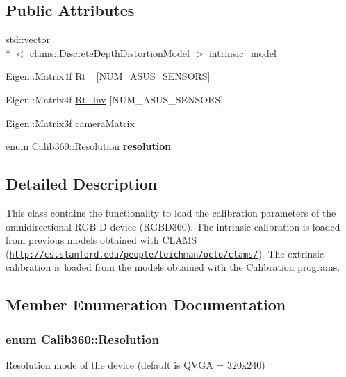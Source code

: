 \subsection*{Public Attributes}
\begin{DoxyCompactItemize}
\item 
std\-::vector\\*
$<$ clams\-::\-Discrete\-Depth\-Distortion\-Model $>$ \hyperlink{classCalib360_aa2e0b8086073711793812d4253b272ec}{intrinsic\-\_\-model\-\_\-}
\item 
Eigen\-::\-Matrix4f \hyperlink{classCalib360_a61dacdf729067dcea6d270f79e628b83}{Rt\-\_\-} \mbox{[}N\-U\-M\-\_\-\-A\-S\-U\-S\-\_\-\-S\-E\-N\-S\-O\-R\-S\mbox{]}
\item 
Eigen\-::\-Matrix4f \hyperlink{classCalib360_a179de6c9f42a6b1bbd4cfda04e857bda}{Rt\-\_\-inv} \mbox{[}N\-U\-M\-\_\-\-A\-S\-U\-S\-\_\-\-S\-E\-N\-S\-O\-R\-S\mbox{]}
\item 
Eigen\-::\-Matrix3f \hyperlink{classCalib360_a27be5251d6ba2a81b6be00424c82b736}{camera\-Matrix}
\item 
\hypertarget{classCalib360_ac6491eb444561b47451f09d6bac3b071}{enum \hyperlink{classCalib360_a323701c4815353e02f79ce58a9ef2e12}{Calib360\-::\-Resolution} {\bfseries resolution}}\label{classCalib360_ac6491eb444561b47451f09d6bac3b071}

\end{DoxyCompactItemize}


\subsection{Detailed Description}
This class contains the functionality to load the calibration parameters of the omnidirectional R\-G\-B-\/\-D device (R\-G\-B\-D360). The intrinsic calibration is loaded from previous models obtained with C\-L\-A\-M\-S (\href{http://cs.stanford.edu/people/teichman/octo/clams/}{\tt http\-://cs.\-stanford.\-edu/people/teichman/octo/clams/}). The extrinsic calibration is loaded from the models obtained with the Calibration programs. 

\subsection{Member Enumeration Documentation}
\hypertarget{classCalib360_a323701c4815353e02f79ce58a9ef2e12}{
\subsubsection[{Resolution}]{\setlength{\rightskip}{0pt plus 5cm}enum {\bf Calib360\-::\-Resolution}}}\label{classCalib360_a323701c4815353e02f79ce58a9ef2e12}
Resolution mode of the device (default is Q\-V\-G\-A = 320x240) 

